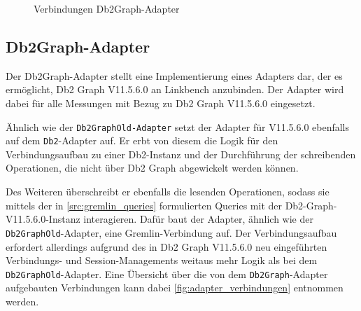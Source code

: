 \begin{figure}[!ht]
    \centering
    \caption{Verbindungen Db2Graph-Adapter}
    \label{fig:adapter_verbindungen}
\end{figure}

\subsection{Db2Graph-Adapter}
\label{implementierung:adapter:db2graph:ga}
Der Db2Graph-Adapter stellt eine Implementierung eines Adapters dar, der es ermöglicht, Db2 Graph V11.5.6.0 an Linkbench anzubinden. Der Adapter wird dabei für alle Messungen mit Bezug zu Db2 Graph V11.5.6.0 eingesetzt. 

Ähnlich wie der \texttt{Db2GraphOld-Adapter} setzt der Adapter für V11.5.6.0 ebenfalls auf dem \texttt{Db2}-Adapter auf. Er erbt von diesem die Logik für den Verbindungsaufbau zu einer Db2-Instanz und der Durchführung der schreibenden Operationen, die nicht über Db2 Graph abgewickelt werden können. 

Des Weiteren überschreibt er ebenfalls die lesenden Operationen, sodass sie mittels der in \autoref{src:gremlin_queries} formulierten Queries mit der Db2-Graph-V11.5.6.0-Instanz interagieren. Dafür baut der Adapter, ähnlich wie der \texttt{Db2Graph\allowbreak Old}-Adapter, eine Gremlin-Verbindung auf. Der Verbindungsaufbau erfordert allerdings aufgrund des in Db2 Graph V11.5.6.0 neu eingeführten Verbindungs- und Session-Managements weitaus mehr Logik als bei dem \texttt{Db2GraphOld}-Adapter. Eine Übersicht über die von dem \texttt{Db2Graph}-Adapter aufgebauten Verbindungen kann dabei \autoref{fig:adapter_verbindungen} entnommen werden.

